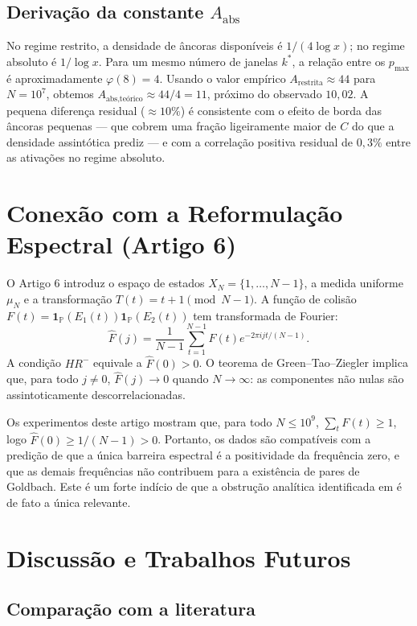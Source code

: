 \documentclass[11pt]{article}
\begin{document}
	\subsection{Derivação da constante $A_{\text{abs}}$}
	
	No regime restrito, a densidade de âncoras disponíveis é $1/(4\log x)$; no regime absoluto é $1/\log x$. Para um mesmo número de janelas $k^*$, a relação entre os $p_{\max}$ é aproximadamente $\varphi(8)=4$. Usando o valor empírico $A_{\text{restrita}} \approx 44$ para $N=10^7$, obtemos $A_{\text{abs,teórico}} \approx 44/4 = 11$, próximo do observado $10{,}02$. A pequena diferença residual ($\approx 10\%$) é consistente com o efeito de borda das âncoras pequenas — que cobrem uma fração ligeiramente maior de $C$ do que a densidade assintótica prediz — e com a correlação positiva residual de $0{,}3\%$ entre as ativações no regime absoluto.
	
	\section{Conexão com a Reformulação Espectral (Artigo 6)}
	
	O Artigo 6 \cite{art6} introduz o espaço de estados $X_N = \{1,\dots,N-1\}$, a medida uniforme $\mu_N$ e a transformação $T(t)=t+1\pmod{N-1}$. A função de colisão $F(t)=\mathbf{1}_{\mathbb{P}}(E_1(t))\mathbf{1}_{\mathbb{P}}(E_2(t))$ tem transformada de Fourier:
	\[
	\widehat{F}(j) = \frac{1}{N-1}\sum_{t=1}^{N-1} F(t) e^{-2\pi i j t/(N-1)}.
	\]
	A condição $HR^-$ equivale a $\widehat{F}(0) > 0$. O teorema de Green–Tao–Ziegler \cite{GTZ} implica que, para todo $j\neq 0$, $\widehat{F}(j) \to 0$ quando $N\to\infty$: as componentes não nulas são assintoticamente descorrelacionadas.
	
	Os experimentos deste artigo mostram que, para todo $N\le 10^9$, $\sum_t F(t) \ge 1$, logo $\widehat{F}(0) \ge 1/(N-1) > 0$. Portanto, os dados são compatíveis com a predição de que a única barreira espectral é a positividade da frequência zero, e que as demais frequências não contribuem para a existência de pares de Goldbach. Este é um forte indício de que a obstrução analítica identificada em \cite{art6} é de fato a única relevante.
	
	\section{Discussão e Trabalhos Futuros}
	
	\subsection{Comparação com a literatura}
	
\end{document}
